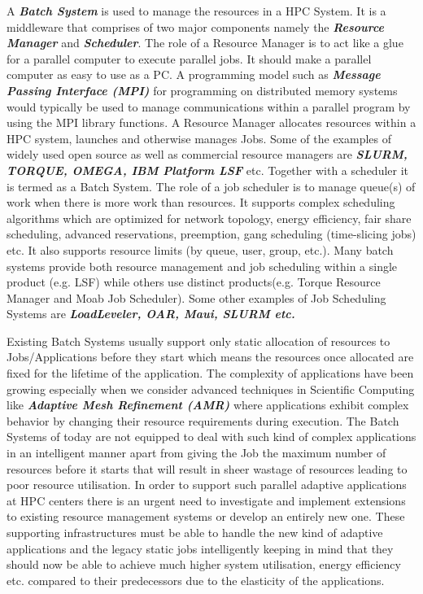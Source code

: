\noindent
A \textbf{\textit{Batch System}} is used to manage the resources in a HPC System. It is a middleware that comprises of two major components namely the \textbf{\textit{Resource Manager}} and \textbf{\textit{Scheduler}}. The role of a Resource Manager is to act like a glue for a parallel computer to execute parallel jobs. It should make a parallel computer as easy to use as a PC. A programming model such as \textbf{\textit{Message Passing Interface (MPI)}} for programming on distributed memory systems would typically be used to manage communications within a parallel program by using the MPI library functions. A Resource Manager allocates resources within a HPC system, launches and otherwise manages Jobs. Some of the examples of widely used open source as well as commercial resource managers are \textbf{\textit{SLURM, TORQUE, OMEGA, IBM Platform LSF}} etc. Together with a scheduler it is termed as a Batch System. The role of a job scheduler is to manage queue(s) of work when there is more work than resources. It supports complex scheduling algorithms which are optimized for network topology, energy efficiency, fair share scheduling, advanced reservations, preemption, gang scheduling (time-slicing jobs) etc. It also supports resource limits (by queue, user, group, etc.). Many batch systems provide both resource management and job scheduling within a single product (e.g. LSF) while others use distinct products(e.g. Torque Resource Manager and Moab Job Scheduler). Some other examples of Job Scheduling Systems are \textbf{\textit{LoadLeveler, OAR, Maui, SLURM etc.}}\\ \par
\noindent
Existing Batch Systems usually support only static allocation of resources to Jobs/Applications before they start which means the resources once allocated are fixed for the lifetime of the application. The complexity of applications have been growing especially when we consider advanced techniques in Scientific Computing like \textbf{\textit{Adaptive Mesh Refinement (AMR)}} where applications exhibit complex behavior by changing their resource requirements during execution. The Batch Systems of today are not equipped to deal with such kind of complex applications in an intelligent manner apart from giving the Job the maximum number of resources before it starts that will result in sheer wastage of resources leading to poor resource utilisation. In order to support such parallel adaptive applications at HPC centers there is an urgent need to investigate and implement extensions to existing resource management systems or develop an entirely new one. These supporting infrastructures must be able to handle the new kind of adaptive applications and the legacy static jobs intelligently keeping in mind that they should now be able to achieve much higher system utilisation, energy efficiency etc. compared to their predecessors due to the elasticity of the applications.

